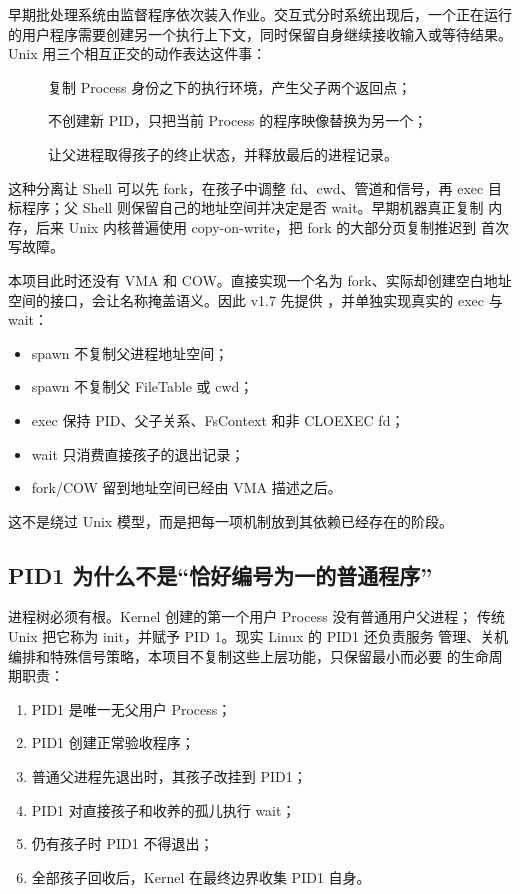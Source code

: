 早期批处理系统由监督程序依次装入作业。交互式分时系统出现后，一个正在运行
的用户程序需要创建另一个执行上下文，同时保留自身继续接收输入或等待结果。
Unix 用三个相互正交的动作表达这件事：

\begin{description}
  \item[] 复制 Process 身份之下的执行环境，产生父子两个返回点；
  \item[] 不创建新 PID，只把当前 Process 的程序映像替换为另一个；
  \item[] 让父进程取得孩子的终止状态，并释放最后的进程记录。
\end{description}

这种分离让 Shell 可以先 fork，在孩子中调整 fd、cwd、管道和信号，再 exec
目标程序；父 Shell 则保留自己的地址空间并决定是否 wait。早期机器真正复制
内存，后来 Unix 内核普遍使用 copy-on-write，把 fork 的大部分页复制推迟到
首次写故障。

本项目此时还没有 VMA 和 COW。直接实现一个名为 fork、实际却创建空白地址
空间的接口，会让名称掩盖语义。因此 v1.7 先提供 ，并单独实现真实的 exec 与 wait：

\begin{itemize}
  \item spawn 不复制父进程地址空间；
  \item spawn 不复制父 FileTable 或 cwd；
  \item exec 保持 PID、父子关系、FsContext 和非 CLOEXEC fd；
  \item wait 只消费直接孩子的退出记录；
  \item fork/COW 留到地址空间已经由 VMA 描述之后。
\end{itemize}

这不是绕过 Unix 模型，而是把每一项机制放到其依赖已经存在的阶段。

\subsection{PID1 为什么不是“恰好编号为一的普通程序”}

进程树必须有根。Kernel 创建的第一个用户 Process 没有普通用户父进程；
传统 Unix 把它称为 init，并赋予 PID 1。现实 Linux 的 PID1 还负责服务
管理、关机编排和特殊信号策略，本项目不复制这些上层功能，只保留最小而必要
的生命周期职责：

\begin{enumerate}
  \item PID1 是唯一无父用户 Process；
  \item PID1 创建正常验收程序；
  \item 普通父进程先退出时，其孩子改挂到 PID1；
  \item PID1 对直接孩子和收养的孤儿执行 wait；
  \item 仍有孩子时 PID1 不得退出；
  \item 全部孩子回收后，Kernel 在最终边界收集 PID1 自身。
\end{enumerate}

